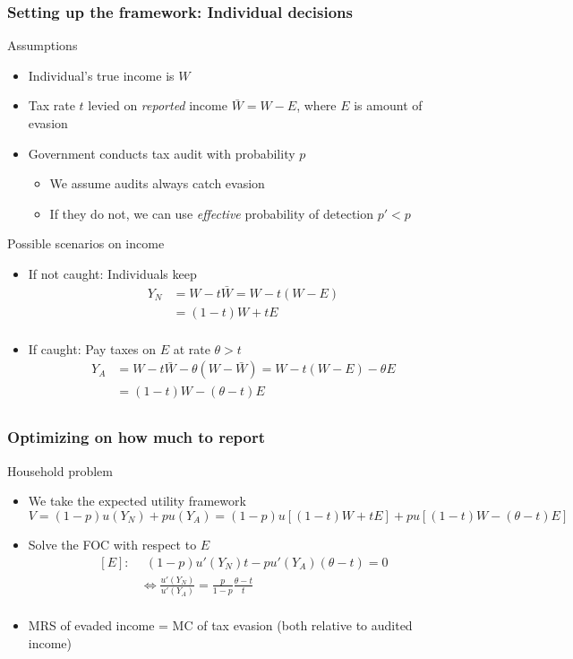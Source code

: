 \documentclass[aspectratio=169]{beamer}
\begin{document}
\begin{frame}
\frametitle{Setting up the framework: Individual decisions} 
Assumptions
\begin{itemize}\setlength\itemsep{3pt}
\item Individual's true income is $W$
\item Tax rate $t$ levied on \textit{reported} income $\bar{W}=W-E$, where $E$ is amount of evasion
\item Government conducts tax audit with probability $p$ 
 \begin{itemize}\setlength\itemsep{3pt}
\item We assume audits always catch evasion 
\item If they do not, we can use \textit{effective} probability of detection $p'<p$
\end{itemize}
\end{itemize}\medskip
Possible scenarios on income
\begin{itemize}\setlength\itemsep{3pt}
  \item If not caught: Individuals keep 
  \[
  \begin{aligned}
  Y_N &= W-t\bar{W} = W-t(W-E)\\
  &=(1-t)W+tE\\
  \end{aligned}
  \]\vspace{-10pt}
  \item If caught: Pay taxes on $E$ at rate $\theta>t$
  \[
  \begin{aligned}
  Y_A&= W-t\bar{W} -\theta (W-\bar{W})=W-t(W-E)-\theta E\\
  &=(1-t)W-(\theta-t)E\\
  \end{aligned}
  \]
\end{itemize}
\end{frame}

\begin{frame}
  \frametitle{Optimizing on how much to report}
  Household problem
   \begin{itemize}\setlength\itemsep{3pt}
\item We take the expected utility framework
\[
V= (1-p)u(Y_N) + p u(Y_A) = (1-p)u[(1-t)W+tE] +p u[(1-t)W-(\theta-t)E]
\]
\item Solve the FOC with respect to $E$
\[
\begin{aligned}
  [E]: &\ \  (1-p)u'(Y_N)t - p u'(Y_A)(\theta-t)=0 \\
  & \iff \frac{u'(Y_N)}{u'(Y_A)}= \frac{p}{1-p}\frac{\theta-t}{t}\\
\end{aligned}
\]
\item MRS of evaded income = MC of tax evasion (both relative to audited income)
\end{itemize}
\end{frame}
\end{document}
